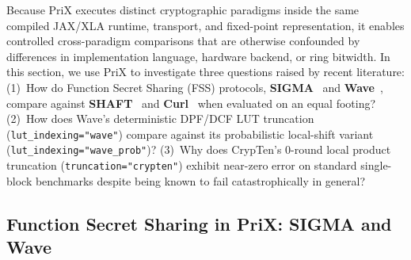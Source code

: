 \documentclass[11pt]{article}
\begin{document}
Because PriX executes distinct cryptographic paradigms inside the same compiled JAX/XLA runtime, transport, and fixed-point representation, it enables controlled cross-paradigm comparisons that are otherwise confounded by differences in implementation language, hardware backend, or ring bitwidth. In this section, we use PriX to investigate three questions raised by recent literature:
(1)~How do Function Secret Sharing (FSS) protocols, \textbf{SIGMA}~\cite{gupta2024sigma} and \textbf{Wave}~\cite{reis2025wave}, compare against \textbf{SHAFT}~\cite{kei2025shaft} and \textbf{Curl}~\cite{santos2024curl} when evaluated on an equal footing?
(2)~How does Wave's deterministic DPF/DCF LUT truncation (\texttt{lut\_indexing="wave"}) compare against its probabilistic local-shift variant (\texttt{lut\_indexing="wave\_prob"})?
(3)~Why does CrypTen's 0-round local product truncation (\texttt{truncation="crypten"}) exhibit near-zero error on standard single-block benchmarks despite being known to fail catastrophically in general?

\subsection{Function Secret Sharing in PriX: SIGMA and Wave}
\label{sec:fss_impl}
\end{document}
